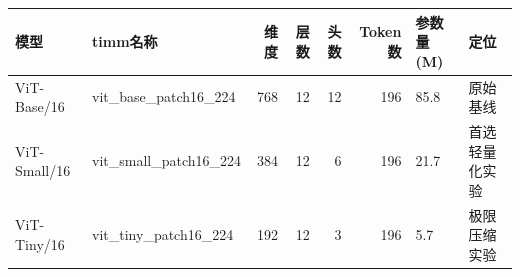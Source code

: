 \begin{tabular}{llrrrrll}
\toprule
模型 & timm名称 & 维度 & 层数 & 头数 & Token数 & 参数量(M) & 定位 \\
\midrule
ViT-Base/16 & vit\_base\_patch16\_224 & 768 & 12 & 12 & 196 & 85.8 & 原始基线 \\
ViT-Small/16 & vit\_small\_patch16\_224 & 384 & 12 & 6 & 196 & 21.7 & 首选轻量化实验 \\
ViT-Tiny/16 & vit\_tiny\_patch16\_224 & 192 & 12 & 3 & 196 & 5.7 & 极限压缩实验 \\
\bottomrule
\end{tabular}